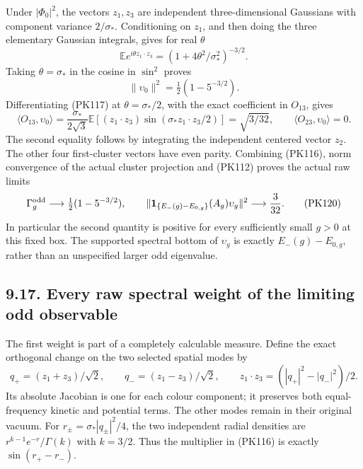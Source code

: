 \documentclass[11pt]{article}
\begin{document}
Under \(|\Phi_0|^2\), the vectors \(z_1,z_3\) are independent
three-dimensional Gaussians with component variance \(2/\sigma_*\).
Conditioning on \(z_1\), and then doing the three elementary Gaussian
integrals, gives for real \(\theta\)
\[
 \mathbb E e^{i\theta z_1\cdot z_3}
       =(1+4\theta^2/\sigma_*^2)^{-3/2}.
 \tag{PK117}
\]
Taking \(\theta=\sigma_*\) in the cosine in \(\sin^2\) proves
\[
 \|\upsilon_0\|^2
       =\tfrac12(1-5^{-3/2}) .
 \tag{PK118}
\]
Differentiating (PK117) at \(\theta=\sigma_*/2\), with
the exact coefficient in \(O_{13}\), gives
\[
 \langle O_{13},\upsilon_0\rangle
 =\frac{\sigma_*}{2\sqrt3}
       \mathbb E[(z_1\cdot z_3)\sin(\sigma_*z_1\cdot z_3/2)]
 =\sqrt{3/32},\qquad
 \langle O_{23},\upsilon_0\rangle=0 .
 \tag{PK119}
\]
The second equality follows by integrating the independent centered
vector \(z_2\). The other four first-cluster vectors have even parity.
Combining (PK116), norm convergence of the actual cluster projection
and (PK112) proves the actual raw limits
\[
 \Gamma_g^{\rm odd}\longrightarrow\tfrac12(1-5^{-3/2}),\qquad
 \|\mathbf1_{\{E_-(g)-E_{0,g}\}}(A_g)\upsilon_g\|^2
                       \longrightarrow\frac3{32}.
 \tag{PK120}
\]
In particular the second quantity is positive for every sufficiently
small \(g>0\) at this fixed box. The supported spectral bottom of
\(\upsilon_g\) is exactly \(E_-(g)-E_{0,g}\), rather than an
unspecified larger odd eigenvalue.

\subsection*{9.17. Every raw spectral weight of the limiting odd observable}

The first weight is part of a completely calculable measure. Define the
exact orthogonal change on the two selected spatial modes by
\[
 q_+=(z_1+z_3)/\sqrt2,\qquad q_-=(z_1-z_3)/\sqrt2,\qquad
 z_1\cdot z_3=(|q_+|^2-|q_-|^2)/2 .
 \tag{PK121}
\]
Its absolute Jacobian is one for each colour component; it preserves
both equal-frequency kinetic and potential terms. The other modes
remain in their original vacuum. For
\(r_\pm=\sigma_*|q_\pm|^2/4\), the two independent radial densities
are \(r^{k-1}e^{-r}/\Gamma(k)\) with \(k=3/2\).
Thus the multiplier in (PK116) is exactly \(\sin(r_+-r_-)\).
\end{document}
